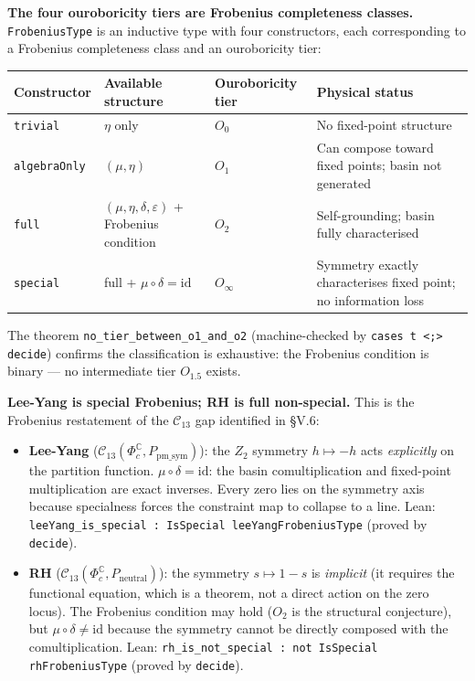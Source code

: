 \documentclass[12pt,a4paper]{article}
\newcommand{\pilcrow}{\S}
\begin{document}
\textbf{The four ouroboricity tiers are Frobenius completeness classes.} \texttt{FrobeniusType} is an inductive type with four constructors, each corresponding to a Frobenius completeness class and an ouroboricity tier:

\begin{table}[htbp]
\centering
\small
{}
\begin{tabularx}{\textwidth}{>{\centering\arraybackslash}X >{\centering\arraybackslash}X >{\centering\arraybackslash}X >{\centering\arraybackslash}X}
\toprule
\rowcolor{gray!25}\textbf{Constructor} & \textbf{Available structure} & \textbf{Ouroboricity tier} & \textbf{Physical status} \\
\midrule
\rowcolors{1}{white}{gray!10}
\texttt{trivial} & $\eta$ only & $O_0$ & No fixed-point structure \\
\texttt{algebraOnly} & $(\mu, \eta)$ & $O_1$ & Can compose toward fixed points; basin not generated \\
\texttt{full} & $(\mu, \eta, \delta, \varepsilon)$ + Frobenius condition & $O_2$ & Self-grounding; basin fully characterised \\
\texttt{special} & full + $\mu \circ \delta = \text{id}$ & $O_{\infty}$ & Symmetry exactly characterises fixed point; no information loss \\
\bottomrule
\end{tabularx}
\end{table}

The theorem \texttt{no\_tier\_between\_o1\_and\_o2} (machine-checked by \texttt{cases t \textless{};\textgreater{} decide}) confirms the classification is exhaustive: the Frobenius condition is binary --- no intermediate tier $O_{1.5}$ exists.

\textbf{Lee-Yang is special Frobenius; RH is full non-special.} This is the Frobenius restatement of the $\mathcal{C}_{13}$ gap identified in \pilcrow{}V.6:

\begin{itemize}
    \item \textbf{Lee-Yang} ($\mathcal{C}_{13}(\Phi_c^{\mathbb{C}}, P_\text{pm\_sym})$): the $Z_2$ symmetry $h \mapsto -h$ acts \emph{explicitly} on the partition function. $\mu \circ \delta = \text{id}$: the basin comultiplication and fixed-point multiplication are exact inverses. Every zero lies on the symmetry axis because specialness forces the constraint map to collapse to a line. Lean: \texttt{leeYang\_is\_special : IsSpecial leeYangFrobeniusType} (proved by \texttt{decide}).
    \item \textbf{RH} ($\mathcal{C}_{13}(\Phi_c^{\mathbb{C}}, P_\text{neutral})$): the symmetry $s \mapsto 1-s$ is \emph{implicit} (it requires the functional equation, which is a theorem, not a direct action on the zero locus). The Frobenius condition may hold ($O_2$ is the structural conjecture), but $\mu \circ \delta \neq \text{id}$ because the symmetry cannot be directly composed with the comultiplication. Lean: \texttt{rh\_is\_not\_special : not IsSpecial rhFrobeniusType} (proved by \texttt{decide}).
\end{itemize}
\end{document}
